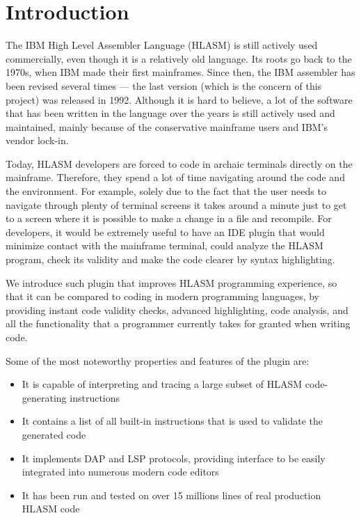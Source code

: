 \chapter{Introduction}

The IBM High Level Assembler Language (HLASM) is still actively used commercially, even though it is a relatively old language. Its roots go back to the 1970s, when IBM made their first mainframes. Since then, the IBM assembler has been revised several times --- the last version (which is the concern of this project) was released in 1992. Although it is hard to believe, a lot of the software that has been written in the language over the years is still actively used and maintained, mainly because of the conservative mainframe users and IBM's vendor lock-in.

Today, HLASM developers are forced to code in archaic terminals directly on the mainframe. Therefore, they spend a lot of time navigating around the code and the environment. For example, solely due to the fact that the user needs to navigate through plenty of terminal screens it takes around a minute just to get to a screen where it is possible to make a change in a file and recompile. For developers, it would be extremely useful to have an IDE plugin that would minimize contact with the mainframe terminal, could analyze the HLASM program, check its validity and make the code clearer by syntax highlighting. 

We introduce such plugin that improves HLASM programming experience, so that it can be compared to coding in modern programming languages, by providing instant code validity checks, advanced highlighting, code analysis, and all the functionality that a programmer currently takes for granted when writing code.

Some of the most noteworthy properties and features of the plugin are:
\begin{itemize}
	\item It is capable of interpreting and tracing a large subset of HLASM code-generating instructions
	\item It contains a list of all built-in instructions that is used to validate the generated code
	\item It implements DAP and LSP protocols, providing interface to be easily integrated into numerous modern code editors
	\item It has been run and tested on over 15 millions lines of real production HLASM code
\end{itemize}

